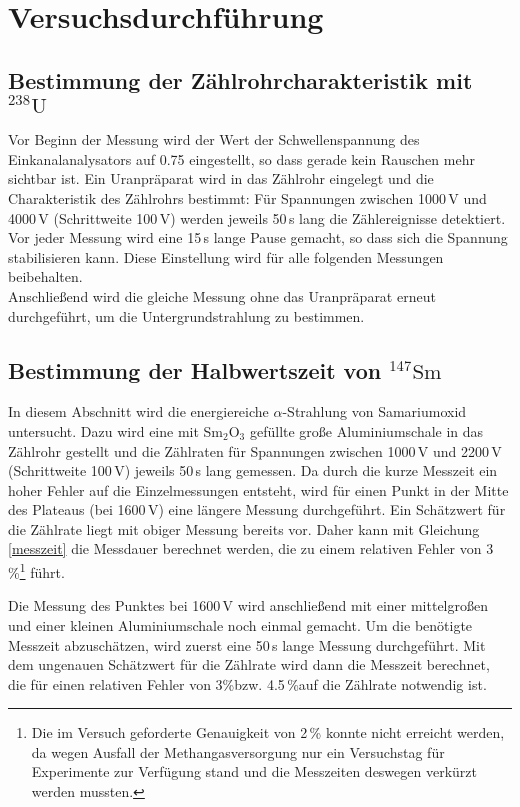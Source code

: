 \section{Versuchsdurchführung}

\subsection{Bestimmung der Zählrohrcharakteristik mit \texorpdfstring{${}^{238}\text{U}$}{U-238}}
Vor Beginn der Messung wird der Wert der Schwellenspannung des
Einkanalanalysators auf 0.75 eingestellt, so dass gerade kein Rauschen mehr
sichtbar ist. Ein Uranpräparat wird in das Zählrohr eingelegt und die
Charakteristik des Zählrohrs bestimmt: Für Spannungen zwischen 1000\,V und
4000\,V (Schrittweite 100\,V) werden jeweils 50\,s lang die Zählereignisse
detektiert. Vor jeder Messung wird eine 15\,s lange Pause gemacht, so dass sich
die Spannung stabilisieren kann. Diese Einstellung wird für alle folgenden
Messungen beibehalten.\\
Anschließend wird die gleiche Messung ohne das Uranpräparat erneut durchgeführt,
um die Untergrundstrahlung zu bestimmen.

\subsection{Bestimmung der Halbwertszeit von \texorpdfstring{${}^{147}\text{Sm}$}{Sm-147}}
In diesem Abschnitt wird die energiereiche $\alpha$-Strahlung von Samariumoxid
untersucht. Dazu wird eine mit Sm$_2$O$_3$ gefüllte große Aluminiumschale in das Zählrohr
gestellt und die Zählraten für Spannungen zwischen 1000\,V und 2200\,V
(Schrittweite 100\,V) jeweils 50\,s lang gemessen.
Da durch die kurze Messzeit ein hoher Fehler auf die Einzelmessungen entsteht,
wird für einen Punkt in der Mitte des Plateaus (bei 1600\,V) eine längere Messung durchgeführt.
Ein Schätzwert für die Zählrate liegt mit obiger Messung bereits vor. Daher kann mit Gleichung 
\ref{messzeit} die Messdauer berechnet werden, die zu einem relativen Fehler von
3\,\%\footnote{Die im Versuch geforderte Genauigkeit von 2\,\% konnte nicht
erreicht werden, da wegen Ausfall der Methangasversorgung nur ein Versuchstag
für Experimente zur Verfügung stand und die Messzeiten deswegen verkürzt werden
mussten.}
führt.


Die Messung des Punktes bei 1600\,V wird anschließend mit einer mittelgroßen
und einer kleinen Aluminiumschale noch einmal gemacht.
Um die benötigte Messzeit abzuschätzen, wird zuerst eine
50\,s lange Messung durchgeführt. Mit dem ungenauen Schätzwert für die Zählrate
wird dann die Messzeit berechnet,
die für einen relativen Fehler von 3\%\footnotemark[1] bzw. 4.5\,\%\footnotemark[1]
auf die Zählrate notwendig ist.

